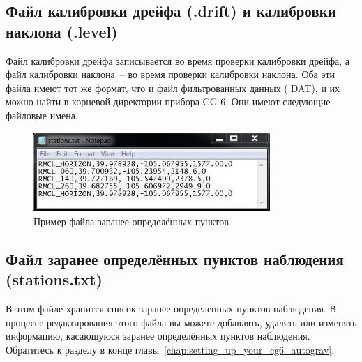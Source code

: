 \subsection{Файл калибровки дрейфа (.drift) и калибровки наклона (.level)}

Файл калибровки дрейфа записывается во время проверки калибровки дрейфа, а файл
калибровки наклона~-- во время проверки калибровки наклона. Оба эти файла имеют
тот же формат, что и файл фильтрованных данных (.DAT), и их можно найти в
корневой директории прибора CG-6. Они имеют следующие файловые имена.



\begin{figure}[H]
  \centering
  \includegraphics[width=0.8\textwidth]{figures/sample_pre-set_stations_file_from_a_cg6_autograv}
  \caption{Пример файла заранее определённых пунктов \cg{}}
  \label{fig:sample_pre-set_stations_file_from_a_cg6_autograv}
\end{figure}

\subsection{Файл заранее определённых пунктов наблюдения (stations.txt)}

В этом файле хранится список заранее определённых пунктов наблюдения. В
процессе редактирования этого файла вы можете добавлять, удалять или
изменять информацию, касающуюся заранее определённых пунктов наблюдения.
Обратитесь к разделу  в
конце главы~\ref{chap:setting_up_your_cg6_autograv}.

